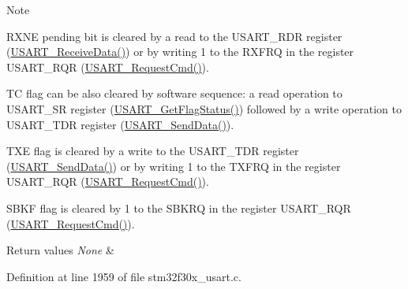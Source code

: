 \begin{DoxyNote}{Note}

\begin{DoxyItemize}
\item R\-X\-N\-E pending bit is cleared by a read to the U\-S\-A\-R\-T\-\_\-\-R\-D\-R register (\hyperlink{group___u_s_a_r_t___exported___functions_gac67a91845b0b1d54d31bdfb1c5e9867c}{U\-S\-A\-R\-T\-\_\-\-Receive\-Data()}) or by writing 1 to the R\-X\-F\-R\-Q in the register U\-S\-A\-R\-T\-\_\-\-R\-Q\-R (\hyperlink{group___u_s_a_r_t___group12_ga9cb3c0fb4f745d1c80481f17a0e73e16}{U\-S\-A\-R\-T\-\_\-\-Request\-Cmd()}).
\item T\-C flag can be also cleared by software sequence\-: a read operation to U\-S\-A\-R\-T\-\_\-\-S\-R register (\hyperlink{group___u_s_a_r_t___exported___functions_ga144630722defc9e312f0ad280b68e9da}{U\-S\-A\-R\-T\-\_\-\-Get\-Flag\-Status()}) followed by a write operation to U\-S\-A\-R\-T\-\_\-\-T\-D\-R register (\hyperlink{group___u_s_a_r_t___exported___functions_ga0b43d42da9540f446d494bf69823c6fb}{U\-S\-A\-R\-T\-\_\-\-Send\-Data()}).
\item T\-X\-E flag is cleared by a write to the U\-S\-A\-R\-T\-\_\-\-T\-D\-R register (\hyperlink{group___u_s_a_r_t___exported___functions_ga0b43d42da9540f446d494bf69823c6fb}{U\-S\-A\-R\-T\-\_\-\-Send\-Data()}) or by writing 1 to the T\-X\-F\-R\-Q in the register U\-S\-A\-R\-T\-\_\-\-R\-Q\-R (\hyperlink{group___u_s_a_r_t___group12_ga9cb3c0fb4f745d1c80481f17a0e73e16}{U\-S\-A\-R\-T\-\_\-\-Request\-Cmd()}).
\item S\-B\-K\-F flag is cleared by 1 to the S\-B\-K\-R\-Q in the register U\-S\-A\-R\-T\-\_\-\-R\-Q\-R (\hyperlink{group___u_s_a_r_t___group12_ga9cb3c0fb4f745d1c80481f17a0e73e16}{U\-S\-A\-R\-T\-\_\-\-Request\-Cmd()}). 
\end{DoxyItemize}
\end{DoxyNote}

\begin{DoxyRetVals}{Return values}
{\em None} & \\
\hline
\end{DoxyRetVals}


Definition at line 1959 of file stm32f30x\-\_\-usart.\-c.

